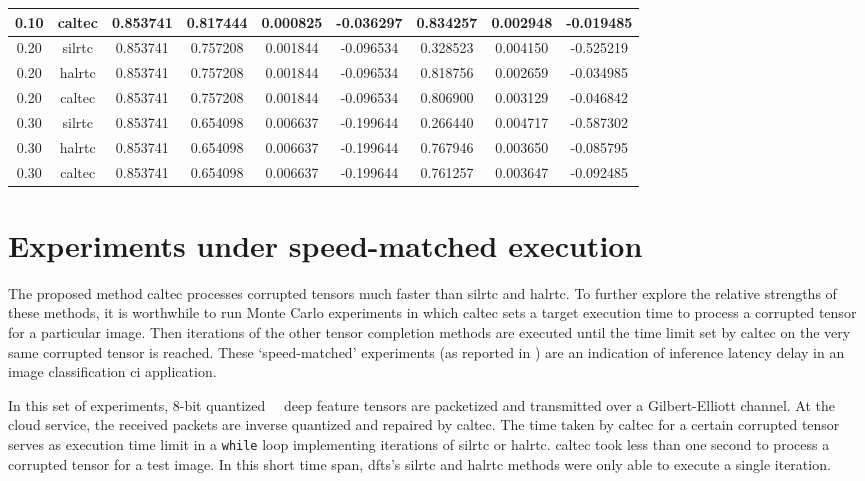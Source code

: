 \begin{table}[H]
\begin{adjustbox}{max width=\textwidth}
\begin{tabular}{|c|c|c|ccc|ccc|}
			0.10 & \gls{caltec} & 0.853741 &  0.817444 &  0.000825 & -0.036297 & 0.834257 &    0.002948 &   -0.019485 \\
			\hline
			0.20 & \gls{silrtc} & 0.853741 &  0.757208 &  0.001844 & -0.096534 &  0.328523 &    0.004150 &   -0.525219\\
			0.20 & \cellcolor{green!25}\gls{halrtc} & 0.853741 &  0.757208 &  0.001844 & -0.096534 & \cellcolor{green!25} 0.818756 &    0.002659 & \cellcolor{green!25}  -0.034985\\
			0.20 & \gls{caltec} & 0.853741 &  0.757208 &  0.001844 & -0.096534 &  0.806900 &    0.003129 &   -0.046842 \\
			\hline
			0.30 & \gls{silrtc} &  0.853741 &  0.654098 &  0.006637 & -0.199644 &   0.266440 &    0.004717 &   -0.587302 \\
			0.30 & \cellcolor{green!25} \gls{halrtc} & 0.853741 &  0.654098 &  0.006637 & -0.199644 & \cellcolor{green!25} 0.767946 &    0.003650 &  \cellcolor{green!25} -0.085795 \\
			0.30 & \gls{caltec} & 0.853741 &  0.654098 &  0.006637 & -0.199644 &  0.761257 &    0.003647 &   -0.092485  \\
			\hline
		\end{tabular}
	\end{adjustbox}
\end{table}



\section{Experiments under speed-matched execution} \label{sec:expts:speed}

The proposed method \gls{caltec} processes corrupted tensors much faster than \gls{silrtc} and \gls{halrtc}. To further explore the relative strengths of these methods, it is worthwhile to run Monte Carlo experiments in which \gls{caltec} sets a target execution time to process a corrupted tensor for a particular image. Then iterations of the other tensor completion methods are executed until the time limit set by \gls{caltec} on the very same corrupted tensor is reached. These `speed-matched' experiments (as reported in \cite{9017944}) are an indication of inference latency delay in an image classification \gls{ci} application.

In this set of experiments, 8-bit quantized ~\addone~deep feature tensors are packetized and transmitted over a Gilbert-Elliott channel. At the cloud service, the received packets are inverse quantized and repaired by \gls{caltec}. The time taken by \gls{caltec} for a certain corrupted tensor serves as execution time limit in a \verb|while| loop implementing iterations of \gls{silrtc} or \gls{halrtc}. \gls{caltec} took less than one second to process a corrupted tensor for a test image. In this short time span, \gls{dfts}'s \gls{silrtc} and \gls{halrtc} methods were only able to execute a single iteration.


